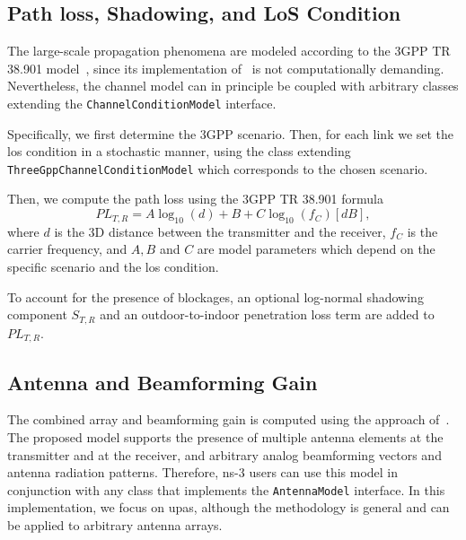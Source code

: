 \subsection{Path loss, Shadowing, and LoS Condition}
The large-scale propagation phenomena are modeled according to the 3GPP TR 38.901 model~\cite{TR38901}, since its implementation of~\cite{tommaso:20} is not computationally demanding. Nevertheless, the channel model can in principle be coupled with arbitrary classes extending the \texttt{Channel\-Condition\-Model} interface.

Specifically, we first determine the 3GPP scenario. Then, for each link we set the \gls{los} condition in a stochastic manner, using the class extending \texttt{Three\-Gpp\-Channel\-Condition\-Model} which corresponds to the chosen scenario.

Then, we compute the path loss using the 3GPP TR 38.901 formula
\begin{equation}
    PL_{T, R} = A \log_{10} (d) + B + C \log_{10} (f_C) [dB],
\end{equation}
where $d$ is the 3D distance between the transmitter and the receiver, $f_C$ is the carrier frequency, and  $A, B$ and $C$ are model parameters which depend on the specific scenario and the \gls{los} condition.

To account for the presence of blockages, an optional log-normal shadowing component $S_{T, R}$ and an outdoor-to-indoor penetration loss term are added to $PL_{T, R}$.

\subsection{Antenna and Beamforming Gain}



The combined array and beamforming gain is computed using the approach of~\cite{8422746}. 
The proposed model supports the presence of multiple antenna elements at the transmitter and at the receiver, and arbitrary analog beamforming vectors and antenna radiation patterns. Therefore, ns-3 users can use this model in conjunction with any class that implements the \texttt{AntennaModel} interface.
In this implementation, we focus on \glspl{upa}, although the methodology is general and can be applied to arbitrary antenna arrays.

